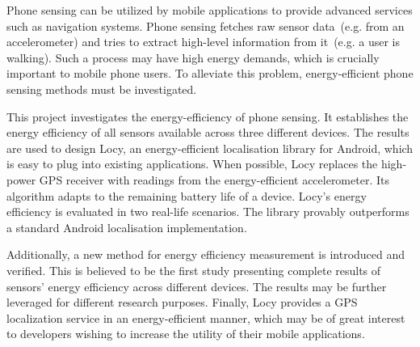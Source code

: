 Phone sensing can be utilized by mobile applications to provide advanced services such as navigation systems. Phone sensing fetches raw sensor data\ (e.g. from an accelerometer) and tries to extract high-level information from it\ (e.g. a user is walking). Such a process may have high energy demands, which is crucially important to mobile phone users. To alleviate this problem, energy-efficient  phone sensing methods must be investigated.  

This project investigates the energy-efficiency of phone sensing. It establishes the energy efficiency of all sensors available across three different devices. The results are used to design Locy, an energy-efficient localisation library for Android, which is easy to plug into existing applications. When possible, Locy replaces the high-power GPS receiver with readings from the energy-efficient accelerometer. Its algorithm adapts to the remaining battery life of a device. Locy's energy efficiency is evaluated in two real-life scenarios. The library provably outperforms a standard Android localisation implementation.

Additionally, a new method for energy efficiency measurement is introduced and verified. This is believed to be the first study presenting complete results of sensors' energy efficiency across different devices. The results may be further leveraged for different research purposes. Finally, Locy provides a GPS localization service in an energy-efficient manner, which may be of great interest to developers wishing to increase the utility of their mobile applications.

